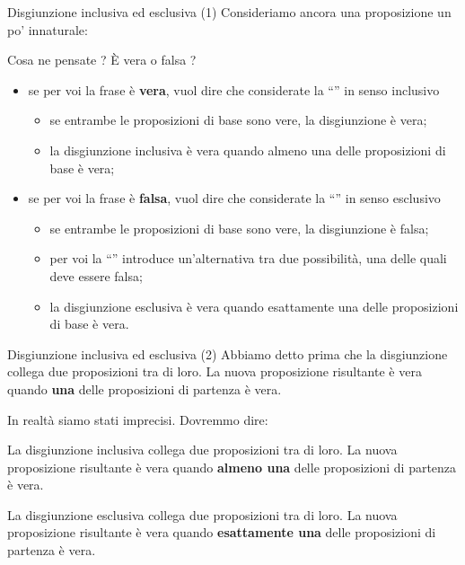 \documentclass[aspectratio=169,10pt,dvipsnames,handout]{beamer}
\begin{document}
\begin{frame}{Disgiunzione inclusiva ed esclusiva (1)}
    Consideriamo ancora una proposizione un po' innaturale:
    \begin{example}
    \end{example}
    Cosa ne pensate ? È vera o falsa ?
    \pause
    \begin{itemize}
        \item se per voi la frase è \textbf{vera}, vuol dire che considerate la ``'' in senso \alert{inclusivo}
              \begin{itemize}
                  \item se entrambe le proposizioni di base sono vere, la disgiunzione è vera;
                  \item la disgiunzione inclusiva è vera quando \alert{almeno una} delle proposizioni di base è vera;
              \end{itemize}
              \pause
        \item se per voi la frase è \textbf{falsa}, vuol dire che considerate la ``'' in senso \alert{esclusivo}
              \begin{itemize}
                  \item se entrambe le proposizioni di base sono vere, la disgiunzione è falsa;
                  \item per voi la ``'' introduce un'alternativa tra due possibilità, una delle quali deve essere falsa;
                  \item la disgiunzione esclusiva è vera quando \alert{esattamente una} delle proposizioni di base è vera.
              \end{itemize}
    \end{itemize}
\end{frame}

\begin{frame}{Disgiunzione inclusiva ed esclusiva (2)}
    Abbiamo detto prima che la \alert{disgiunzione} collega due proposizioni tra di loro. La nuova proposizione risultante è vera quando \textbf{una} delle proposizioni di partenza è vera.

    \medskip
    In realtà siamo stati imprecisi. Dovremmo dire:
    \begin{definition}
        La \alert{disgiunzione inclusiva} collega due proposizioni tra di loro. La nuova proposizione risultante è vera quando \textbf{almeno una} delle proposizioni di partenza è vera.
    \end{definition}

    \begin{definition}
        La \alert{disgiunzione esclusiva} collega due proposizioni tra di loro. La nuova proposizione risultante è vera quando \textbf{esattamente una} delle proposizioni di partenza è vera.
    \end{definition}
\end{frame}
\end{document}
